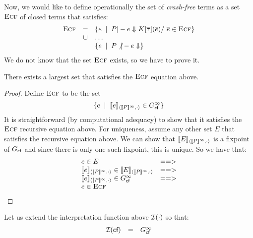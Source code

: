 \documentclass[preprint,nocopyrightspace]{sigplanconf}
\begin{document}
Now, we would like to define operationally the set of {\em crash-free} terms as a set $\textsc{Ecf}$ of 
closed terms that satisfies:
{\setlength{\arraycolsep}{2pt}
\[\begin{array}{rcl}
   \textsc{Ecf} & =    & \{ e \;\mid\; P |- e \Downarrow K[\overline{\tau}](\overline{e}) /\ \overline{e} \in \textsc{Ecf} \} \\
        & \cup & \ldots \\
        &      & \{ e \;\mid\; P \not|- e \Downarrow \} 
\end{array}\]}%
We do not know that the set $\textsc{Ecf}$ exists, so we have to prove it. 
\begin{lemma}
There exists a largest set that satisfies the $\textsc{Ecf}$ equation above.
\end{lemma} 
\begin{proof}
Define $\textsc{Ecf}$ to be the set
\[ \{ e\;\mid\; [\![e]\!]_{\langle {[\![P]\!]^\infty},{\cdot}\rangle} \in G_{\textsf{cf}}^{\infty}\} \]
It is straightforward (by computational adequacy) to show that it satisfies the $\textsc{Ecf}$ recursive
equation above. For uniqueness, assume any other set $E$ that satisfies the recursive equation
above. We can show that $[\![E]\!]_{\langle {[\![P]\!]^\infty},{\cdot}\rangle}$ is a
fixpoint of $G_{\textsf{cf}}$ and since there is only one such fixpoint, this is unique. So we have that:
\[\begin{array}{ll}
 e \in E & ==> \\ 
 \interp{e}{\dbrace{P}^\infty}{\cdot} \in \interp{E}{\dbrace{P}^\infty}{\cdot} & ==> \\
 \interp{e}{\dbrace{P}^\infty}{\cdot} \in G_{\lcfZ}^\infty & ==> \\
 e \in \Ecf 
\end{array}\] 
\end{proof}

Let us extend the interpretation function above ${\cal I}(\cdot)$ so that: 
\[\begin{array}{rcl}
   {\cal I}(\textsf{cf})  & = & G_{\textsf{cf}}^{\infty} 
\end{array}\]
\end{document}
